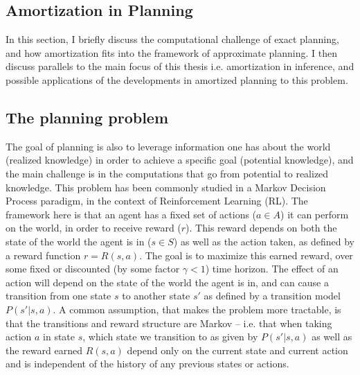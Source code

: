 

\subsection{Amortization in Planning}

In this section, I briefly discuss the computational challenge of exact planning, and how amortization fits into the framework of approximate planning. I then discuss parallels to the main focus of this thesis i.e. amortization in inference, and possible applications of the developments in amortized planning to this problem.

\subsection*{The planning problem}

The goal of planning is also to leverage information one has about the world (realized knowledge) in order to achieve a specific goal (potential knowledge), and the main challenge is in the computations that go from potential to realized knowledge. This problem has been commonly studied in a Markov Decision Process paradigm, in the context of Reinforcement Learning (RL). The framework here is that an agent has a fixed set of actions ($a \in A$) it can perform on the world, in order to receive reward ($r$). This reward depends on both the state of the world the agent is in ($s \in S$) as well as the action taken, as defined by a reward function $r = R(s, a)$. The goal is to maximize this earned reward, over some fixed or discounted (by some factor $\gamma < 1$) time horizon. The effect of an action will depend on the state of the world the agent is in, and can cause a transition from one state $s$ to another state $s'$ as defined by a transition model $P(s' | s, a)$. A common assumption, that makes the problem more tractable, is that the transitions and reward structure are Markov -- i.e. that when taking action $a$ in state $s$, which state we transition to as given by $P(s' | s, a)$ as well as the reward earned $R(s,a)$ depend only on the current state and current action and is independent of the history of any previous states or actions.


